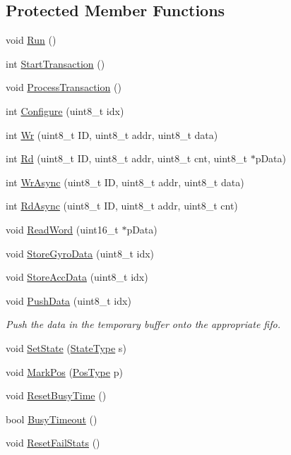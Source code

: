 \subsection*{Protected Member Functions}
\begin{DoxyCompactItemize}
\item 
void \hyperlink{class_i_m_u_aadf38b912ad23374c4ee8e40fb9f3638}{Run} ()
\item 
int \hyperlink{class_i_m_u_a8dfecb837ea9fcf9d190423dca9beb7f}{StartTransaction} ()
\item 
void \hyperlink{class_i_m_u_ac39f14c617d4eea9de6175497744465a}{ProcessTransaction} ()
\item 
int \hyperlink{class_i_m_u_af4bede5261a1d6018c72782d8c54445e}{Configure} (uint8\_\-t idx)
\item 
int \hyperlink{class_i_m_u_af80eef2eb22d08faf697dd708b18303c}{Wr} (uint8\_\-t ID, uint8\_\-t addr, uint8\_\-t data)
\item 
int \hyperlink{class_i_m_u_ab6c8ef618465524c88a021e2206b2de5}{Rd} (uint8\_\-t ID, uint8\_\-t addr, uint8\_\-t cnt, uint8\_\-t $\ast$pData)
\item 
int \hyperlink{class_i_m_u_a2c38589ebcb357dfc8f987a5d41c845b}{WrAsync} (uint8\_\-t ID, uint8\_\-t addr, uint8\_\-t data)
\item 
int \hyperlink{class_i_m_u_ad39e85995898b9251032c89a3587974c}{RdAsync} (uint8\_\-t ID, uint8\_\-t addr, uint8\_\-t cnt)
\item 
void \hyperlink{class_i_m_u_a07362afd858bca1ce960f3809248e4e9}{ReadWord} (uint16\_\-t $\ast$pData)
\item 
void \hyperlink{class_i_m_u_a5b58d543be70886335e439a2b4f28a8e}{StoreGyroData} (uint8\_\-t idx)
\item 
void \hyperlink{class_i_m_u_ae9c290e496eb2a76aefc626c81fe4da9}{StoreAccData} (uint8\_\-t idx)
\item 
void \hyperlink{class_i_m_u_a14f3437170b38602f281b3f97d9ce129}{PushData} (uint8\_\-t idx)
\begin{DoxyCompactList}\small\item\em Push the data in the temporary buffer onto the appropriate fifo. \item\end{DoxyCompactList}\item 
void \hyperlink{class_i_m_u_a5d80a28d98df12c536f525b56b7e5abe}{SetState} (\hyperlink{class_i_m_u_a7b5e1bf1cf1407b3e4cf0dd2e18b523f}{StateType} s)
\item 
void \hyperlink{class_i_m_u_a7f9a7744a4fa3ea40da008cabd5da7b7}{MarkPos} (\hyperlink{class_i_m_u_ad01128d82debc1e4213affe4858f3144}{PosType} p)
\item 
void \hyperlink{class_i_m_u_ab3992da77876e9b5cae8bc9d1334ff7b}{ResetBusyTime} ()
\item 
bool \hyperlink{class_i_m_u_a6a61733d65cf2b60db212e0be9a00fed}{BusyTimeout} ()
\item 
void \hyperlink{class_i_m_u_a89de27b845ce9e103436cfb7ae8e6441}{ResetFailStats} ()
\end{DoxyCompactItemize}
